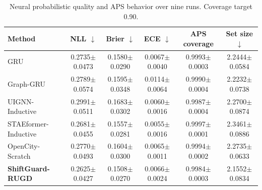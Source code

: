 \begin{table}[t]
\centering
\caption{Neural probabilistic quality and APS behavior over nine runs. Coverage target 0.90.}
\label{tab:calibration-full}
\begin{tabular}{lccccc}
\toprule
Method & NLL $\downarrow$ & Brier $\downarrow$ & ECE $\downarrow$ & APS coverage & Set size $\downarrow$ \\
\midrule
GRU & 0.2735$\pm$0.0473 & 0.1580$\pm$0.0290 & 0.0067$\pm$0.0040 & 0.9993$\pm$0.0003 & 2.2444$\pm$0.0584 \\
Graph-GRU & 0.2789$\pm$0.0574 & 0.1595$\pm$0.0348 & 0.0114$\pm$0.0064 & 0.9990$\pm$0.0004 & 2.2232$\pm$0.0738 \\
UIGNN-Inductive & 0.2991$\pm$0.0511 & 0.1683$\pm$0.0302 & 0.0060$\pm$0.0016 & 0.9987$\pm$0.0004 & 2.2700$\pm$0.0874 \\
STAEformer-Inductive & 0.2681$\pm$0.0455 & 0.1557$\pm$0.0281 & 0.0055$\pm$0.0016 & 0.9997$\pm$0.0001 & 2.3461$\pm$0.0886 \\
OpenCity-Scratch & 0.2770$\pm$0.0493 & 0.1604$\pm$0.0300 & 0.0065$\pm$0.0011 & 0.9994$\pm$0.0002 & 2.2735$\pm$0.0633 \\
\textbf{ShiftGuard-RUGD} & 0.2625$\pm$0.0427 & 0.1508$\pm$0.0270 & 0.0066$\pm$0.0024 & 0.9984$\pm$0.0003 & 2.1552$\pm$0.0834 \\
\bottomrule
\end{tabular}
\end{table}
